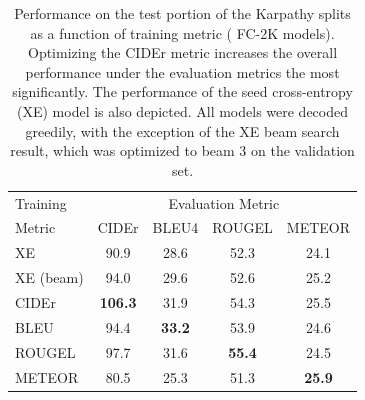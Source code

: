 \documentclass[10pt,twocolumn,letterpaper]{article}
\begin{document}

\begin{table}[ht]
\begin{center}
\begin{tabular}{l|cccc}
\hline \hline
Training & \multicolumn{4}{c}{Evaluation Metric} \\
Metric & CIDEr & BLEU4 & ROUGEL & METEOR  \\
\hline
XE & 90.9 & 28.6 & 52.3 & 24.1  \\ %
XE (beam) & 94.0 & 29.6 & 52.6 & 25.2 \\ %
\hline
CIDEr      & {\bf 106.3} & 31.9 & 54.3 & 25.5  \\ %
BLEU       & 94.4 & {\bf 33.2} & 53.9 & 24.6  \\ %
ROUGEL & 97.7 & 31.6 & {\bf 55.4} & 24.5  \\ %
METEOR & 80.5 & 25.3 & 51.3 & {\bf 25.9}  \\ %

\hline \hline
\end{tabular}
\end{center}
\caption{Performance on the test portion of the Karpathy splits \cite{Karpathy} as a function of training metric ( FC-2K models). Optimizing the CIDEr metric increases the overall performance under the evaluation metrics the most significantly. The performance of the seed cross-entropy (XE) model is also depicted. All models were decoded greedily, with the exception of the XE beam search result, which was optimized to beam 3 on the validation set.}
\label{metric_table}
\end{table}
\end{document}
